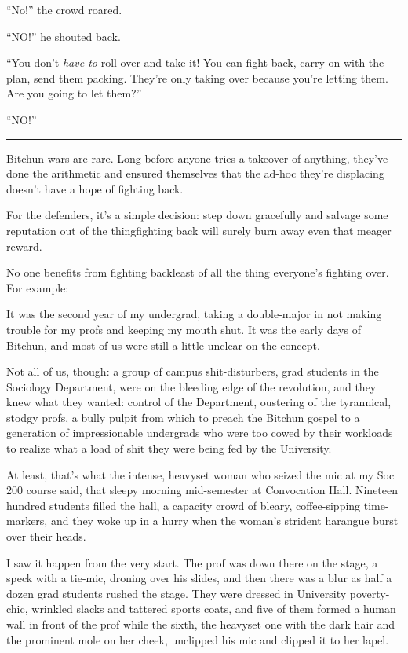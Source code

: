 “No!” the crowd roared.

“NO!” he shouted back.

“You don't \emph{have to} roll over and take it! You can fight
back, carry on with the plan, send them packing. They're only
taking over because you're letting them. Are you going to let
them?”

“NO!”

\begin{center}\rule{1in}{0.4pt}\end{center}

Bitchun wars are rare. Long before anyone tries a takeover of
anything, they've done the arithmetic and ensured themselves that
the ad-hoc they're displacing doesn't have a hope of fighting
back.

For the defenders, it's a simple decision: step down gracefully and
salvage some reputation out of the thing{\dash}fighting back will surely
burn away even that meager reward.

No one benefits from fighting back{\dash}least of all the thing
everyone's fighting over. For example:

It was the second year of my undergrad, taking a double-major in
not making trouble for my profs and keeping my mouth shut. It was
the early days of Bitchun, and most of us were still a little
unclear on the concept.

Not all of us, though: a group of campus shit-disturbers, grad
students in the Sociology Department, were on the bleeding edge of
the revolution, and they knew what they wanted: control of the
Department, oustering of the tyrannical, stodgy profs, a bully
pulpit from which to preach the Bitchun gospel to a generation of
impressionable undergrads who were too cowed by their workloads to
realize what a load of shit they were being fed by the University.

At least, that's what the intense, heavyset woman who seized the
mic at my Soc 200 course said, that sleepy morning mid-semester at
Convocation Hall. Nineteen hundred students filled the hall, a
capacity crowd of bleary, coffee-sipping time-markers, and they
woke up in a hurry when the woman's strident harangue burst over
their heads.

I saw it happen from the very start. The prof was down there on the
stage, a speck with a tie-mic, droning over his slides, and then
there was a blur as half a dozen grad students rushed the stage.
They were dressed in University poverty-chic, wrinkled slacks and
tattered sports coats, and five of them formed a human wall in
front of the prof while the sixth, the heavyset one with the dark
hair and the prominent mole on her cheek, unclipped his mic and
clipped it to her lapel.

